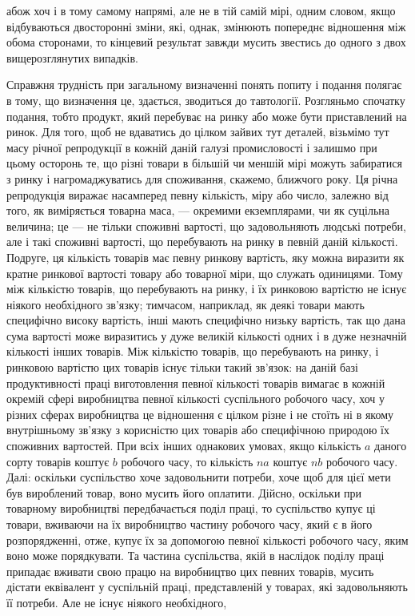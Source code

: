 \parcont{}  %
абож хоч і в тому самому напрямі, але не в тій самій мірі,
одним словом, якщо відбуваються двосторонні зміни, які, однак,
змінюють попереднє відношення між обома сторонами, то кінцевий
результат завжди мусить звестись до одного з двох
вищерозглянутих випадків.

Справжня трудність при загальному визначенні понять попиту
і подання полягає в тому, що визначення це, здається, зводиться
до тавтології. Розгляньмо спочатку подання, тобто продукт,
який перебуває на ринку або може бути приставлений на
ринок. Для того, щоб не вдаватись до цілком зайвих тут
деталей, візьмімо тут масу річної репродукції в кожній даній
галузі промисловості і залишмо при цьому осторонь те, що різні
товари в більшій чи меншій мірі можуть забиратися з ринку
і нагромаджуватись для споживання, скажемо, ближчого року.
Ця річна репродукція виражає насамперед певну кількість, міру
або число, залежно від того, як виміряється товарна маса, —
окремими екземплярами, чи як суцільна величина; це — не тільки
споживні вартості, що задовольняють людські потреби, але і такі
споживні вартості, що перебувають на ринку в певній даній
кількості. Подруге, ця кількість товарів має певну ринкову
вартість, яку можна виразити як кратне ринкової вартості товару
або товарної міри, що служать одиницями. Тому між
кількістю товарів, що перебувають на ринку, і їх ринковою
вартістю не існує ніякого необхідного зв’язку; тимчасом, наприклад,
як деякі товари мають специфічно високу вартість,
інші мають специфічно низьку вартість, так що дана сума вартості
може виразитись у дуже великій кількості одних і в дуже
незначній кількості інших товарів. Між кількістю товарів, що
перебувають на ринку, і ринковою вартістю цих товарів існує
тільки такий зв’язок: на даній базі продуктивності праці виготовлення
певної кількості товарів вимагає в кожній окремій
сфері виробництва певної кількості суспільного робочого часу,
хоч у різних сферах виробництва це відношення є цілком різне
і не стоїть ні в якому внутрішньому зв’язку з корисністю цих
товарів або специфічною природою їх споживних вартостей.
При всіх інших однакових умовах, якщо кількість $a$ даного
сорту товарів коштує $b$ робочого часу, то кількість $na$ коштує
$nb$ робочого часу. Далі: оскільки суспільство хоче задовольнити
потреби, хоче щоб для цієї мети був вироблений товар, воно мусить
його оплатити. Дійсно, оскільки при товарному виробництві
передбачається поділ праці, то суспільство купує ці товари,
вживаючи на їх виробництво частину робочого часу, який
є в його розпорядженні, отже, купує їх за допомогою певної
кількості робочого часу, яким воно може порядкувати. Та частина
суспільства, якій в наслідок поділу праці припадає вживати
свою працю на виробництво цих певних товарів, мусить
дістати еквівалент у суспільній праці, представленій у товарах,
які задовольняють її потреби. Але не існує ніякого необхідного,
\parbreak{}  %
